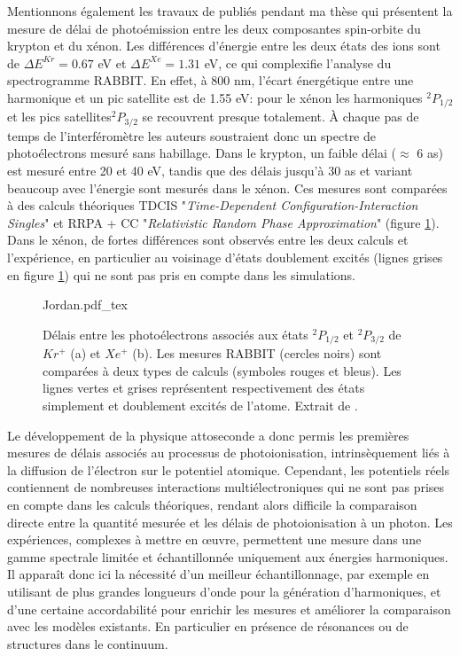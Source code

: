 Mentionnons également les travaux de  publiés pendant ma thèse qui présentent la mesure de délai de photoémission entre les deux composantes spin-orbite du krypton et du xénon. Les différences d'énergie entre les deux états des ions sont de $\Delta E^{Kr} = 0.67$ eV et $\Delta E^{Xe} = 1.31$ eV, ce qui complexifie l'analyse du spectrogramme RABBIT. En effet, à 800 nm, l'écart énergétique entre une harmonique et un pic satellite est de 1.55 eV: pour le xénon les harmoniques $^2P_{1/2}$ et les pics satellites$^2P_{3/2}$ se recouvrent presque totalement. \`A chaque pas de temps de l'interféromètre les auteurs soustraient donc un spectre de photoélectrons mesuré sans habillage. Dans le krypton, un faible délai ($\approx$ 6 as) est mesuré entre 20 et 40 eV, tandis que des délais jusqu'à 30 as et variant beaucoup avec l'énergie sont mesurés dans le xénon. Ces mesures sont comparées à des calculs théoriques TDCIS "\textit{Time-Dependent Configuration-Interaction Singles}" et RRPA + CC "\textit{Relativistic Random Phase Approximation}" (figure \ref{fig:Jordan}). Dans le xénon, de fortes différences sont observés entre les deux calculs et l'expérience, en particulier au voisinage d'états doublement excités (lignes grises en figure \ref{fig:Jordan}) qui ne sont pas pris en compte dans les simulations.
\begin{figure}
\centering
\def\svgwidth{0.6\textwidth}
{Jordan.pdf_tex}
\caption{Délais entre les photoélectrons associés aux états $^2P_{1/2}$ et $^2P_{3/2}$ de $Kr^+$ (a) et $Xe^+$ (b). Les mesures RABBIT (cercles noirs) sont comparées à deux types de calculs (symboles rouges et bleus). Les lignes vertes et grises représentent respectivement des états simplement et doublement excités de l'atome. Extrait de .}
\label{fig:Jordan}
\end{figure}

Le développement de la physique attoseconde a donc permis les premières mesures de délais associés au processus de photoionisation, intrinsèquement liés à la diffusion de l'électron sur le potentiel atomique. Cependant, les potentiels réels contiennent de nombreuses interactions multiélectroniques qui ne sont pas prises en compte dans les calculs théoriques, rendant alors difficile la comparaison directe entre la quantité mesurée et les délais de photoionisation à un photon. Les expériences, complexes à mettre en \oe{uvre}, permettent une mesure dans une gamme spectrale limitée et échantillonnée uniquement aux énergies harmoniques. Il apparaît donc ici la nécessité d'un meilleur échantillonnage, par exemple en utilisant de plus grandes longueurs d'onde pour la génération d'harmoniques, et d'une certaine accordabilité pour enrichir les mesures et améliorer la comparaison avec les modèles existants. En particulier en présence de résonances ou de structures dans le continuum.

